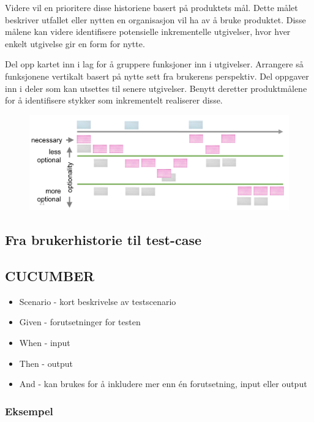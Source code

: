 Videre vil en prioritere disse historiene basert på produktets mål.
Dette målet beskriver utfallet eller nytten en organisasjon vil ha av å
bruke produktet. Disse målene kan videre identifisere potensielle
inkrementelle utgivelser, hvor hver enkelt utgivelse gir en form for
nytte.

Del opp kartet inn i lag for å gruppere funksjoner inn i utgivelser.
Arrangere så funksjonene vertikalt basert på nytte sett fra brukerens
perspektiv. Del oppgaver inn i deler som kan utsettes til senere
utgivelser. Benytt deretter produktmålene for å identifisere stykker som
inkrementelt realiserer disse.

\begin{figure}[htbp]
\centering
\includegraphics{Forelesning 11/img/3.png}
\caption{}
\end{figure}

\subsection{Fra brukerhistorie til test-case}

\subsection{CUCUMBER}

\begin{itemize}
\item
  Scenario - kort beskrivelse av testscenario
\item
  Given - forutsetninger for testen
\item
  When - input
\item
  Then - output
\item
  And - kan brukes for å inkludere mer enn én forutsetning, input eller
  output
\end{itemize}
\subsubsection{Eksempel}

